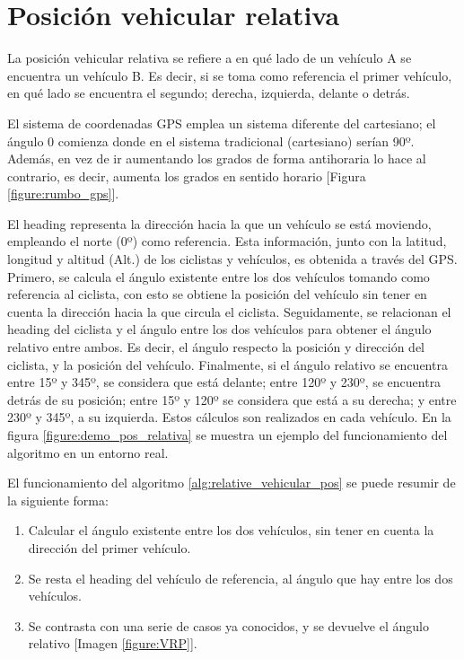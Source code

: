 \section{Posición vehicular relativa}\label{apendice:posicion_relative}
La posición vehicular relativa se refiere a en qué lado de un vehículo A se encuentra
un vehículo B. Es decir, si se toma como referencia el primer vehículo, en qué lado se
encuentra el segundo; derecha, izquierda, delante o detrás.

El sistema de coordenadas GPS emplea un sistema diferente del cartesiano; el ángulo 0
comienza donde en el sistema tradicional (cartesiano) serían 90º. Además, en vez de ir
aumentando los grados de forma antihoraria lo hace al contrario, es decir, aumenta los
grados en sentido horario [Figura \ref{figure:rumbo_gps}].

El heading representa la dirección hacia la que un vehículo se está moviendo, empleando
el norte (0º) como referencia. Esta información, junto con la latitud, longitud y
altitud (Alt.) de los ciclistas y vehículos, es obtenida a través del GPS. Primero, se
calcula el ángulo existente entre los dos vehículos tomando como referencia al ciclista,
con esto se obtiene la posición del vehículo sin tener en cuenta la dirección hacia la que
circula el ciclista. Seguidamente, se relacionan el heading del ciclista y el ángulo entre
los dos vehículos para obtener el ángulo relativo entre ambos. Es decir, el ángulo respecto
la posición y dirección del ciclista, y la posición del vehículo. Finalmente, si el ángulo
relativo se encuentra entre 15º y 345º, se considera que está delante; entre 120º y 230º,
se encuentra detrás de su posición; entre 15º y 120º se considera que está a su derecha;
y entre 230º y 345º, a su izquierda. Estos cálculos son realizados en cada vehículo. En la
figura \ref{figure:demo_pos_relativa} se muestra un ejemplo del funcionamiento del algoritmo
en un entorno real.

El funcionamiento del algoritmo \ref{alg:relative_vehicular_pos} se puede resumir de la
siguiente forma:
\begin{enumerate}
	\item Calcular el ángulo existente entre los dos vehículos, sin tener en cuenta
	la dirección del primer vehículo.
	\item Se resta el heading del vehículo de referencia, al ángulo que hay entre
	los dos vehículos.
	\item Se contrasta con una serie de casos ya conocidos, y se devuelve el ángulo
 	relativo [Imagen \ref{figure:VRP}].
\end{enumerate}

